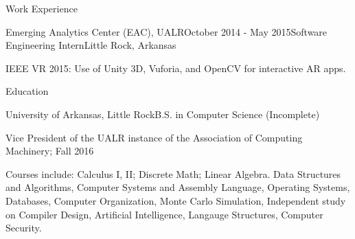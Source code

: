 \documentclass{resume} %
\begin{document}
\begin{rSection}{Work Experience}

\begin{rSubsection}{Emerging Analytics Center (EAC), UALR}{October 2014 - May 2015}{Software Engineering Intern}{Little Rock, Arkansas}
	\item IEEE VR 2015: Use of Unity 3D, Vuforia, and OpenCV for interactive AR apps.
\end{rSubsection}


\end{rSection}


\begin{rSection}{Education}

\begin{rSubsection}{University of Arkansas, Little Rock}{}{B.S. in Computer Science (Incomplete)}

	\item Vice President of the UALR instance of the Association of Computing Machinery; Fall 2016
	\item Courses include: Calculus I, II; Discrete Math; Linear Algebra. Data Structures and Algorithms, Computer Systems and Assembly Language, Operating Systems, Databases, Computer Organization, Monte Carlo Simulation, Independent study on Compiler Design, Artificial Intelligence, Langauge Structures, Computer Security.
\end{rSubsection}


\end{rSection}
\end{document}
